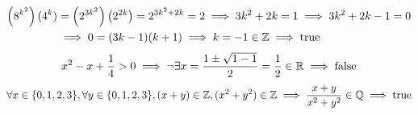 \documentclass[../MATH135.tex]{subfiles}
\begin{document}
\begin{enumerate}
\begin{tasks}
\begin{align*}
							\left(8^{k^2}\right)(4^k) &= \left(2^{3k^2}\right)\left(2^{2k}\right)
									= 2^{3k^2 + 2k}
									= 2
									\implies 3k^2 + 2k = 1
									\implies 3k^2 + 2k - 1 = 0 \\
								&\implies 0 = (3k - 1)(k + 1)
								\implies k = -1 \in \mathbb{Z}
								\implies \text{true}	
						\end{align*}
					\task
						\[
							x^2 - x + \frac{1}{4} > 0
								\implies \lnot\exists x = \frac{1 \pm \sqrt{1 - 1}}{2} = \frac{1}{2}\in \mathbb{R}
								\implies \text{false}
						\]
					\task
						\[
							\forall x \in \{0, 1, 2, 3\}, \forall y \in \{0, 1, 2, 3\}, 
								(x + y) \in \mathbb{Z}, 
								(x^2 + y^2) \in \mathbb{Z}
								\implies \frac{x + y}{x^2 + y^2} \in \mathbb{Q}
								\implies \text{true}
						\]
					\task
						
				\end{tasks}
		\end{enumerate}
\end{document}
